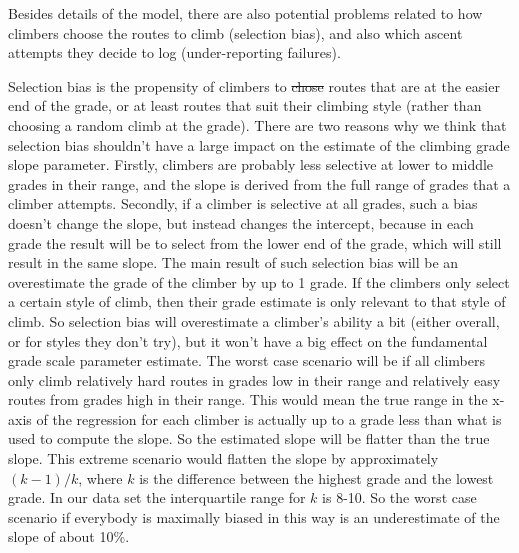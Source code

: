\documentclass[12pt]{article}
\providecommand{\DIFaddtex}[1]{{\protect\color{blue}\uwave{#1}}} %
\providecommand{\DIFdeltex}[1]{{\protect\color{red}\sout{#1}}}                      %
\providecommand{\DIFaddbegin}{} %
\providecommand{\DIFaddend}{} %
\providecommand{\DIFdelbegin}{} %
\providecommand{\DIFdelend}{} %
\providecommand{\DIFadd}[1]{\texorpdfstring{\DIFaddtex{#1}}{#1}} %
\providecommand{\DIFdel}[1]{\texorpdfstring{\DIFdeltex{#1}}{}} %
\newcommand{\DIFscaledelfig}{0.5}
\newlength{\DIFdelgraphicswidth} %
\newlength{\DIFdelgraphicsheight} %
\newcommand{\DIFaddincludegraphics}[2][]{{\color{blue}\fbox{\DIFOincludegraphics[#1]{#2}}}} %
\newcommand{\DIFdelincludegraphics}[2][]{%
\sbox{\DIFdelgraphicsbox}{\DIFOincludegraphics[#1]{#2}}%
\settoboxwidth{\DIFdelgraphicswidth}{\DIFdelgraphicsbox} %
\settoboxtotalheight{\DIFdelgraphicsheight}{\DIFdelgraphicsbox} %
\scalebox{\DIFscaledelfig}{%
\parbox[b]{\DIFdelgraphicswidth}{\usebox{\DIFdelgraphicsbox}\\[-\baselineskip] \rule{\DIFdelgraphicswidth}{0em}}\llap{\resizebox{\DIFdelgraphicswidth}{\DIFdelgraphicsheight}{%
\setlength{\unitlength}{\DIFdelgraphicswidth}%
\begin{picture}(1,1)%
\thicklines\linethickness{2pt} %
{\color[rgb]{1,0,0}\put(0,0){\framebox(1,1){}}}%
{\color[rgb]{1,0,0}\put(0,0){\line( 1,1){1}}}%
{\color[rgb]{1,0,0}\put(0,1){\line(1,-1){1}}}%
\end{picture}%
}\hspace*{3pt}}} %
} %
\DeclareRobustCommand{\DIFaddbegin}{\DIFOaddbegin \let\includegraphics\DIFaddincludegraphics} %
\DeclareRobustCommand{\DIFaddend}{\DIFOaddend \let\includegraphics\DIFOincludegraphics} %
\DeclareRobustCommand{\DIFdelbegin}{\DIFOdelbegin \let\includegraphics\DIFdelincludegraphics} %
\DeclareRobustCommand{\DIFdelend}{\DIFOaddend \let\includegraphics\DIFOincludegraphics} %
\begin{document}
Besides details of the model, there are also potential problems related to how climbers choose the routes to climb (selection bias), and also which ascent attempts they decide to log (under-reporting failures).

Selection bias is the propensity of climbers to \DIFdelbegin \DIFdel{chose }\DIFdelend \DIFaddbegin \DIFadd{choose }\DIFaddend routes that are at the easier end of the grade, or at least routes that suit their climbing style (rather than choosing a random climb at the grade). There are two reasons why we think that selection bias shouldn't have a large impact on the estimate of the climbing grade slope parameter. Firstly, climbers are probably less selective at lower to middle grades in their range, and the slope is derived from the full range of grades that a climber attempts. Secondly, if a climber is selective at all grades, such a bias doesn't change the slope, but instead changes the intercept, because in each grade the result will be to select from the lower end of the grade, which will still result in the same slope. The main result of such selection bias will be an overestimate the grade of the climber by up to 1 grade. If the climbers only select a certain style of climb, then their grade estimate is only relevant to that style of climb. So selection bias will overestimate a climber's ability a bit (either overall, or for styles they don't try), but it won't have a big effect on the fundamental grade scale parameter estimate. The worst case scenario will be if all climbers only climb relatively hard routes in grades low in their range and relatively easy routes from grades high in their range. This would mean the true range in the x-axis of the regression for each climber is actually up to a grade less than what is used to compute the slope. So the estimated slope will be flatter than the true slope. This extreme scenario would flatten the slope by approximately $(k-1)/k$, where $k$ is the difference between the highest grade and the lowest grade. In our data set the interquartile range for $k$ is 8-10. So the worst case scenario if everybody is maximally biased in this way is an underestimate of the slope of about 10\%.
\end{document}
